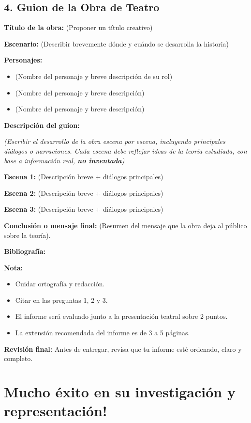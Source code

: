 \documentclass[
  letterpaper,
  DIV=11,
  numbers=noendperiod]{scrartcl}
\begin{document}
\subsection{4. Guion de la Obra de
Teatro}\label{guion-de-la-obra-de-teatro}

\textbf{Título de la obra:} (Proponer un título creativo)

\textbf{Escenario:} (Describir brevemente dónde y cuándo se desarrolla
la historia)

\textbf{Personajes:}

\begin{itemize}
\item
  (Nombre del personaje y breve descripción de su rol)
\item
  (Nombre del personaje y breve descripción)
\item
  (Nombre del personaje y breve descripción)
\end{itemize}

\textbf{Descripción del guion:}

\emph{(Escribir el desarrollo de la obra escena por escena, incluyendo
principales diálogos o narraciones. Cada escena debe reflejar ideas de
la teoría estudiada, con base a información real, \textbf{no
inventada})}

\textbf{Escena 1:} (Descripción breve + diálogos principales)

\textbf{Escena 2:} (Descripción breve + diálogos principales)

\textbf{Escena 3:} (Descripción breve + diálogos principales)

\textbf{Conclusión o mensaje final:} (Resumen del mensaje que la obra
deja al público sobre la teoría).

\textbf{Bibliografía:}

\textbf{Nota:}

\begin{itemize}
\item
  Cuidar ortografía y redacción.
\item
  Citar en las preguntas 1, 2 y 3.
\item
  El informe será evaluado junto a la presentación teatral sobre 2
  puntos.
\item
  La extensión recomendada del informe es de 3 a 5 páginas.
\end{itemize}

\textbf{Revisión final:} Antes de entregar, revisa que tu informe esté
ordenado, claro y completo.

\section{Mucho éxito en su investigación y
representación!}\label{mucho-uxe9xito-en-su-investigaciuxf3n-y-representaciuxf3n}
\end{document}
